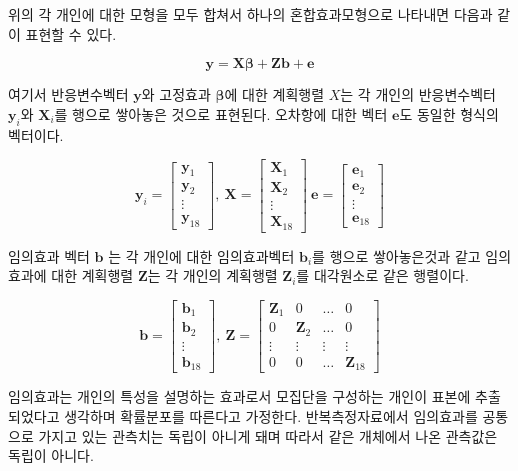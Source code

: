 \documentclass[
]{book}
\newcommand{\bm}[1]{ \symbf{#1}}
\begin{document}
위의 각 개인에 대한 모형을 모두 합쳐서 하나의 혼합효과모형으로 나타내면 다음과 같이 표현할 수 있다.

\begin{equation}
\bm  y = \bm  X \bm \beta + \bm Z \bm b + \bm e 
\label{eq:lme1}
\end{equation}

여기서 반응변수벡터 \(\bm y\)와 고정효과 \(\bm \beta\)에 대한 계획행렬 \(X\)는 각 개인의 반응변수벡터 \(\bm y_i\)와 \(\bm X_i\)를 행으로 쌓아놓은 것으로 표현된다. 오차항에 대한 벡터 \(\bm e\)도 동일한 형식의 벡터이다.

\[  
\bm y_i=\begin{bmatrix}
\bm y_{1} \\
\bm y_{2} \\
\vdots \\
\bm y_{18}
\end{bmatrix},~\bm X =
\begin{bmatrix}
\bm X_1 \\
\bm X_2 \\
\vdots \\
\bm  X_{18} 
\end{bmatrix}
~ \bm e =
\begin{bmatrix}
\bm e_1 \\
\bm e_2 \\
\vdots  \\
\bm e_{18} 
\end{bmatrix}
\]

임의효과 벡터 \({\bm b}\) 는 각 개인에 대한 임의효과벡터 \(\bm b_i\)를 행으로 쌓아놓은것과 같고 임의효과에 대한 계획행렬 \(\bm Z\)는 각 개인의 계획행렬 \(\bm Z_i\)를 대각원소로 같은 행렬이다.

\[ 
\bm b=\begin{bmatrix}
\bm b_{1} \\
\bm b_{2} \\
\vdots \\
\bm b_{18}
\end{bmatrix},~\bm Z =
\begin{bmatrix}
\bm Z_1 & 0 & \dots & 0 \\
0   & \bm Z_2 & \dots & 0 \\
\vdots & \vdots & \vdots & \vdots  \\
0 & 0 & \dots & \bm Z_{18}
\end{bmatrix}
\]

임의효과는 개인의 특성을 설명하는 효과로서 모집단을 구성하는 개인이 표본에 추출되었다고 생각하며 확률분포를 따른다고 가정한다. 반복측정자료에서 임의효과를 공통으로 가지고 있는 관측치는 독립이 아니게 돼며 따라서 같은 개체에서 나온 관측값은 독립이 아니다.
\end{document}

